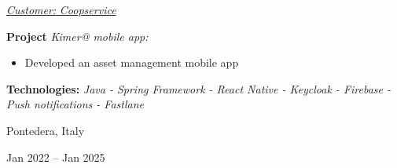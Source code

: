 \documentclass[10pt, a4paper]{article}
\newenvironment{highlights}{
    \begin{itemize}[
        topsep=0.10 cm,
        parsep=0.10 cm,
        partopsep=0pt,
        itemsep=0pt,
        leftmargin=0.4 cm + 10pt
    ]
}{
    \end{itemize}
} %
\newenvironment{twocolentry}[2][]{
    \onecolentry
    \def\secondColumn{#2}
    \setcolumnwidth{\fill, 4.5 cm}
    \begin{paracol}{2}
}{
    \switchcolumn \raggedleft \secondColumn
    \end{paracol}
    \endonecolentry
} %
\begin{document}
\begin{twocolentry}{
            \fontsize{14}{18}Pontedera, Italy

        Jan 2022 – Jan 2025
            \normalsize
        }
                \vspace{0.10 cm}

                \vspace{0.10 cm}

                \textcolor{tertiaryColor}{\faAngleDoubleRight\hspace{0.1cm}\underline{\textit{Customer:} \textit{Coopservice}}}

                \vspace{0.2cm}
                \textbf{Project \faAngleRight} \textit{Kimer@ mobile app:}

                \begin{highlights}
                        \item Developed an asset management mobile app
                \end{highlights}
                \faBuffer
                \textbf{ Technologies:} \textit{Java - Spring Framework - React Native - Keycloak - Firebase - Push notifications - Fastlane}

                \vspace{0.10 cm}

        \end{twocolentry}


        \vspace{0.2 cm}
\end{document}
